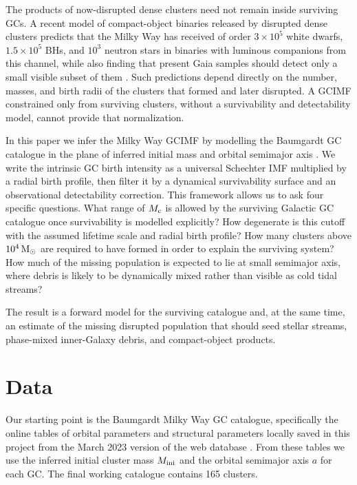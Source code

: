 \documentclass[fleqn,usenatbib]{mnras}
\begin{document}
The products of now-disrupted dense clusters need not remain inside surviving GCs. A recent model of compact-object binaries released by disrupted dense clusters predicts that the Milky Way has received of order $3\times10^5$ white dwarfs, $1.5\times10^5$ BHs, and $10^3$ neutron stars in binaries with luminous companions from this channel, while also finding that present Gaia samples should detect only a small visible subset of them \citep{SchiebelbeinZwack2026}. Such predictions depend directly on the number, masses, and birth radii of the clusters that formed and later disrupted. A GCIMF constrained only from surviving clusters, without a survivability and detectability model, cannot provide that normalization.

In this paper we infer the Milky Way GCIMF by modelling the Baumgardt GC catalogue in the plane of inferred initial mass and orbital semimajor axis \citep{Baumgardt2019,BaumgardtCatalog2023}. We write the intrinsic GC birth intensity as a universal Schechter IMF multiplied by a radial birth profile, then filter it by a dynamical survivability surface and an observational detectability correction. This framework allows us to ask four specific questions. What range of $M_{\rm c}$ is allowed by the surviving Galactic GC catalogue once survivability is modelled explicitly? How degenerate is this cutoff with the assumed lifetime scale and radial birth profile? How many clusters above $10^4\,{\rm M}_\odot$ are required to have formed in order to explain the surviving system? How much of the missing population is expected to lie at small semimajor axis, where debris is likely to be dynamically mixed rather than visible as cold tidal streams?

The result is a forward model for the surviving catalogue and, at the same time, an estimate of the missing disrupted population that should seed stellar streams, phase-mixed inner-Galaxy debris, and compact-object products.

\section{Data}\label{sec:data}
Our starting point is the Baumgardt Milky Way GC catalogue, specifically the online tables of orbital parameters and structural parameters locally saved in this project from the March 2023 version of the web database \citep{Baumgardt2019,BaumgardtCatalog2023}. From these tables we use the inferred initial cluster mass $M_{\rm ini}$ and the orbital semimajor axis $a$ for each GC. The final working catalogue contains 165 clusters.
\end{document}
